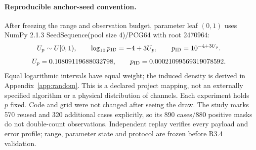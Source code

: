 \paragraph{Reproducible anchor-seed convention.}
After freezing the range and observation budget, parameter leaf $(0,1)$
uses NumPy 2.1.3 SeedSequence(pool size 4)/PCG64 with root 2470964:
\begin{equation}
 U_p\sim U[0,1),\qquad
 \log_{10}p_{\rm ID}=-4+3U_p,\qquad
 p_{\rm ID}=10^{-4+3U_p}.
 \label{eq:r33-mapping}
\end{equation}
\begin{equation}
 U_p=0.10809119688032798,\qquad p_{\rm ID}=0.00021099569319078592.
 \label{eq:r33-personal}
\end{equation}
Equal logarithmic intervals have equal weight; the induced density is
derived in Appendix~\ref{app:random}. This is a declared project mapping,
not an externally specified algorithm or a physical distribution of channels.
Each experiment holds $ p $ fixed. Code and grid were not changed after
seeing the draw. The study marks 570 reused and 320 additional cases
explicitly, so its 890 cases/880 positive masks do not double-count
observations. Independent replay verifies every payload and error profile;
range, parameter state and protocol are frozen before R3.4 validation.
